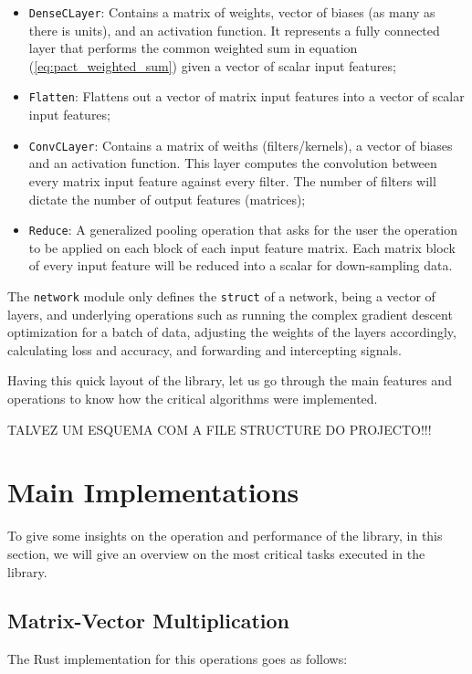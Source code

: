 \begin{itemize}
	\item \texttt{DenseCLayer}: Contains a matrix of weights, vector of biases (as many as there is units), and an activation function. It represents a fully connected layer that performs the common weighted sum in equation (\ref{eq:pact_weighted_sum}) given a vector of scalar input features;
	\item \texttt{Flatten}: Flattens out a vector of matrix input features into a vector of scalar input features;
	\item \texttt{ConvCLayer}: Contains a matrix of weiths (filters/kernels), a vector of biases and an activation function. This layer computes the convolution between every matrix input feature against every filter. The number of filters will dictate the number of output features (matrices);
	\item \texttt{Reduce}: A generalized pooling operation that asks for the user the operation to be applied on each block of each input feature matrix. Each matrix block of every input feature will be reduced into a scalar for down-sampling data.
\end{itemize}

The \texttt{network} module only defines the \texttt{struct} of a network, being a vector of layers, and underlying operations such as running the complex gradient descent optimization for a batch of data, adjusting the weights of the layers accordingly, calculating loss and accuracy, and forwarding and intercepting signals.

Having this quick layout of the library, let us go through the main features and operations to know how the critical algorithms were implemented.

TALVEZ UM ESQUEMA COM A FILE STRUCTURE DO PROJECTO!!!

\section{Main Implementations}
To give some insights on the operation and performance of the library, in this section, we will give an overview on the most critical tasks executed in the library.

\subsection{Matrix-Vector Multiplication}

The Rust implementation for this operations goes as follows:

